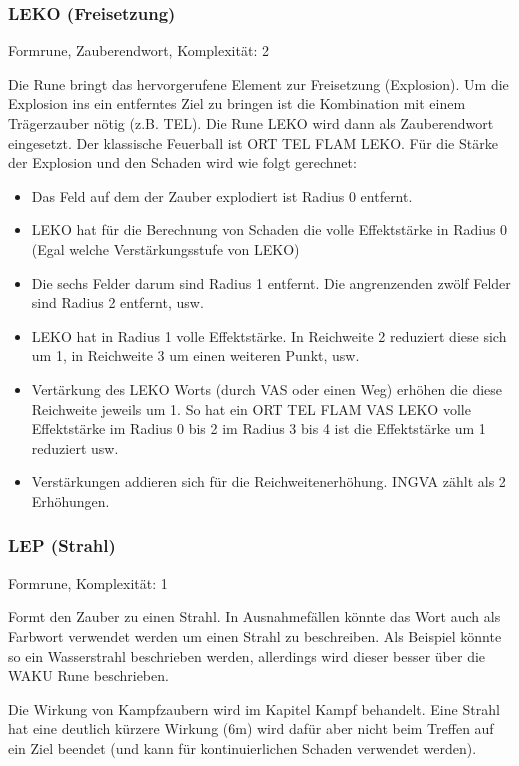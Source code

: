 \documentclass{article}
\begin{document}
\subsubsection{LEKO (Freisetzung)}

Formrune, Zauberendwort, Komplexität: 2

Die Rune bringt das hervorgerufene Element zur Freisetzung (Explosion). Um die Explosion ins ein entferntes Ziel zu
bringen ist die Kombination mit einem Trägerzauber nötig (z.B. TEL). Die Rune LEKO wird dann als Zauberendwort
eingesetzt. Der klassische Feuerball ist ORT TEL FLAM LEKO. Für die Stärke der Explosion und den Schaden wird wie
folgt gerechnet:

\begin{itemize}
\item Das Feld auf dem der Zauber explodiert ist Radius 0 entfernt.
\item LEKO hat für die Berechnung von Schaden die volle Effektstärke in Radius 0 (Egal welche Verstärkungsstufe von LEKO)
\item Die sechs Felder darum sind Radius 1 entfernt. Die angrenzenden zwölf Felder sind Radius 2 entfernt, usw.
\item LEKO hat in Radius 1 volle Effektstärke. In Reichweite 2 reduziert diese sich um 1, in Reichweite 3 um einen weiteren Punkt, usw.
\item Vertärkung des LEKO Worts (durch VAS oder einen Weg) erhöhen die diese Reichweite jeweils um 1. So hat ein ORT TEL FLAM VAS LEKO volle Effektstärke im Radius 0 bis 2 im Radius 3 bis 4 ist die Effektstärke um 1 reduziert usw.
\item Verstärkungen addieren sich für die Reichweitenerhöhung. INGVA zählt als 2 Erhöhungen.
\end{itemize}

\subsubsection{LEP (Strahl)}

Formrune, Komplexität: 1

Formt den Zauber zu einen Strahl. In Ausnahmefällen könnte das Wort auch als Farbwort verwendet werden um einen
Strahl zu beschreiben. Als Beispiel könnte so ein Wasserstrahl beschrieben werden, allerdings wird dieser besser über
die WAKU Rune beschrieben.

Die Wirkung von Kampfzaubern wird im Kapitel Kampf behandelt. Eine Strahl hat eine deutlich kürzere Wirkung (6m) wird
dafür aber nicht beim Treffen auf ein Ziel beendet (und kann für kontinuierlichen Schaden verwendet werden).
\end{document}
